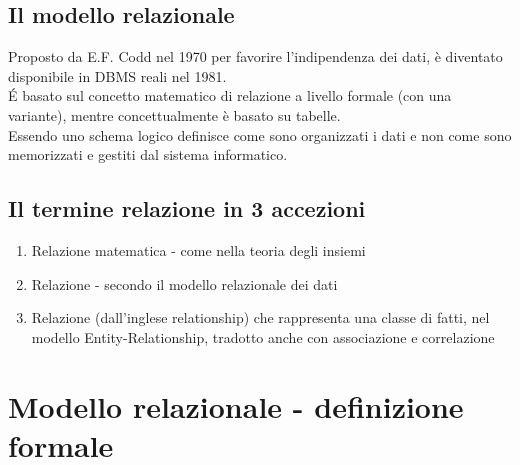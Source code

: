  \subsection{Il modello relazionale}
 Proposto da E.F. Codd nel 1970 per favorire l'indipendenza dei dati, è
 diventato disponibile in DBMS reali nel 1981.
 \\ \'E basato sul concetto matematico di relazione a livello formale (con una variante),
 mentre concettualmente è basato su tabelle.
 \\ Essendo uno schema logico definisce come sono organizzati i dati e non come
 sono memorizzati e gestiti dal sistema informatico.
 \subsection{Il termine relazione in 3 accezioni}
 \begin{enumerate}
    \item Relazione matematica - come nella teoria degli insiemi
    \item Relazione - secondo il modello relazionale dei dati
    \item Relazione (dall'inglese relationship) che rappresenta una classe di fatti,
    nel modello Entity-Relationship, tradotto anche con associazione e correlazione
 \end{enumerate}
 \section{Modello relazionale - definizione formale}
 
